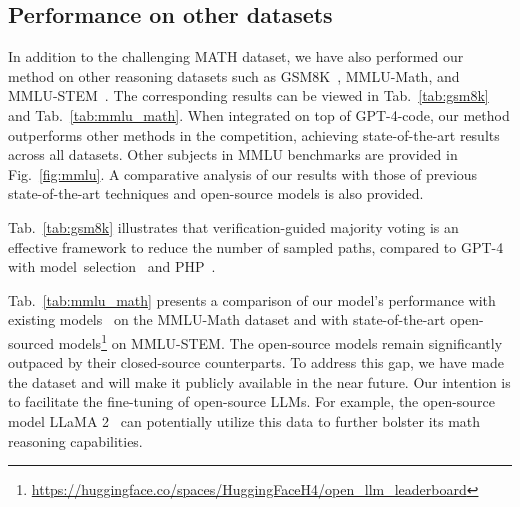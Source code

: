 \documentclass{article} \usepackage{iclr2023_conference,times}
\begin{document}
\subsection{Performance on other datasets}


In addition to the challenging MATH dataset, we have also performed our method on other reasoning datasets such as GSM8K~\citep{cobbe2021gsm8k}, MMLU-Math, and MMLU-STEM~\citep{Hendrycks2020MeasuringMM}. The corresponding results can be viewed in Tab.~\ref{tab:gsm8k} and Tab.~\ref{tab:mmlu_math}. When integrated on top of GPT-4-code, our method outperforms other methods in the competition, achieving state-of-the-art results across all datasets. Other subjects in MMLU benchmarks are provided in Fig.~\ref{fig:mmlu}.  A comparative analysis of our results with those of previous state-of-the-art techniques and open-source models is also provided. 

Tab.~\ref{tab:gsm8k} illustrates that verification-guided majority voting is an effective framework to reduce the number of sampled paths, compared to GPT-4 with model~selection~\citep{zhao2023automatic} and PHP~\citep{zheng2023progressive}.

Tab.~\ref{tab:mmlu_math} presents a comparison of our model's performance with existing models~\citep{hoffmann2022training,taylor2022galactica} on the MMLU-Math dataset and with state-of-the-art open-sourced models\footnote{\url{https://huggingface.co/spaces/HuggingFaceH4/open_llm_leaderboard}} on MMLU-STEM. The open-source models remain significantly outpaced by their closed-source counterparts. To address this gap,  we have made the dataset and will make it publicly available in the near future. Our intention is to facilitate the fine-tuning of open-source LLMs. For example, the open-source model LLaMA 2~\citep{touvron2023llama} can potentially utilize this data to further bolster its math reasoning capabilities.
\end{document}
